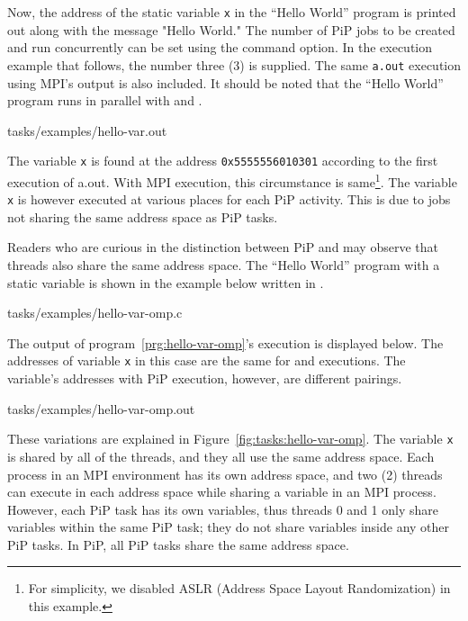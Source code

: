 Now, the address of the static variable {\tt x} in the ``Hello World''
program is printed out along with the message "Hello World." The
number of PiP jobs to be created and run concurrently can be set using
the  command option. In the execution example that
follows, the number three (3) is supplied. The same {\tt a.out}
execution using MPI's output is also included. It should be noted that
the ``Hello World'' program runs in parallel with 
and .  

 {tasks/examples/hello-var.out}

The variable {\tt x} is found at the address {\tt 0x5555556010301}
according to the first execution of a.out. With MPI execution, this
circumstance is same\footnote{For simplicity, we disabled ASLR
  (Address Space Layout Randomization) in this example.}. The variable
{\tt x} is however executed at various places for each 
PiP activity. This is due to  jobs not sharing the same address
space as PiP tasks.

Readers who are curious in the distinction between
PiP and  may observe that threads also share the same address
space. The ``Hello World'' program with a static variable is shown in
the example below written in .

 {tasks/examples/hello-var-omp.c}

The output of program~\ref{prg:hello-var-omp}'s execution is displayed
below. The addresses of variable {\tt x} in this case are the same for
 and  executions. The variable's addresses with
PiP execution, however, are different pairings.

 {tasks/examples/hello-var-omp.out}

These variations are explained in
Figure~\ref{fig:tasks:hello-var-omp}. The variable {\tt x} is shared 
by all of the  threads, and they all use the same address
space. Each  process in an MPI environment has its own address
space, and two (2) threads can execute in each address space while
sharing a variable in an MPI process. However, each PiP task has its
own variables, thus threads 0 and 1 only share variables within the
same PiP task; they do not share variables inside any other PiP
tasks. In PiP, all PiP tasks share the same address space.


